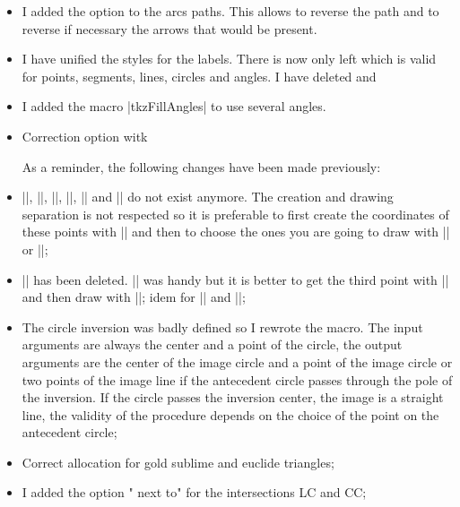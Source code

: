 \begin{itemize}
\item I added the option  to the arcs paths. This allows to reverse the path and to reverse if necessary the arrows that would be present.


\item I have unified the styles for the labels. There is now only  left which is valid for points, segments, lines, circles and angles. I have deleted   and 

\item I added the macro |tkzFillAngles| to use several angles.

\item Correction option  witk 

As a reminder, the following changes have been made previously:
  
 \item  |\tkzDrawMedian|, |\tkzDrawBisector|, |\tkzDrawAltitude|, |\tkzDrawMedians|, |\tkzDrawBisectors| and  |\tkzDrawAltitudes| do not exist anymore. The creation and drawing separation is not respected so it is preferable to first create the coordinates of these points with |\tkzDefSpcTriangle[median]| and then to choose the ones you are going to draw with |\tkzDrawSegments| or |\tkzDrawLines|;
 
\item |\tkzDrawTriangle| has been deleted.  |\tkzDrawTriangle[equilateral]| was handy but it is better to get the third point with |\tkzDefTriangle[equilateral]| and then draw with |\tkzDrawPolygon|; idem for |\tkzDrawSquare| and |\tkzDrawGoldRectangle|; 


\item The circle inversion was badly defined so I rewrote the macro. The input arguments are always the center and a point of the circle, the output arguments are the center of the image circle and a point of the image circle or two points of the image line if the antecedent circle passes through the pole of the inversion. If the circle passes the inversion center, the image is a straight line, the validity of the procedure depends on the choice of the point on the antecedent circle; 

\item Correct allocation for gold sublime and euclide triangles;


\item I added the option " next to" for the intersections LC and CC;



\end{itemize}
